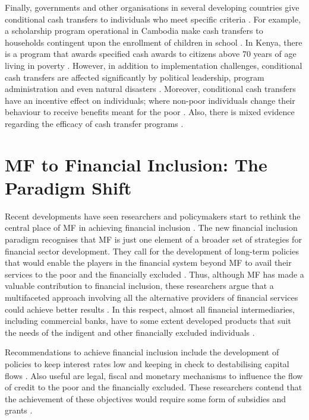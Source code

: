 \documentclass[a4paper, nobind]{templates/ociamthesis}
\begin{document}
Finally, governments and other organisations in several developing countries give conditional cash transfers to individuals who meet specific criteria \autocite{rawlings2005evaluating,tadesse2019grants}. For example, a scholarship program operational in Cambodia make cash transfers to households contingent upon the enrollment of children in school \autocite{ferreira2017own}. In Kenya, there is a program that awards specified cash awards to citizens above 70 years of age living in poverty \autocite{garcia2017educational}. However, in addition to implementation challenges, conditional cash transfers are affected significantly by political leadership, program administration and even natural disasters \autocite{rodgers2014war}. Moreover, conditional cash transfers have an incentive effect on individuals; where non-poor individuals change their behaviour to receive benefits meant for the poor \autocite{brown2012microfinance}. Also, there is mixed evidence regarding the efficacy of cash transfer programs \autocite{garcia2017educational}.

\hypertarget{mf-to-financial-inclusion-the-paradigm-shift}{%
\section{MF to Financial Inclusion: The Paradigm Shift}\label{mf-to-financial-inclusion-the-paradigm-shift}}

\noindent Recent developments have seen researchers and policymakers start to rethink the central place of MF in achieving financial inclusion \autocite{cobb2016funding}. The new financial inclusion paradigm recognises that MF is just one element of a broader set of strategies for financial sector development. They call for the development of long-term policies that would enable the players in the financial system beyond MF to avail their services to the poor and the financially excluded \autocite{ghosh2013microfinance}. Thus, although MF has made a valuable contribution to financial inclusion, these researchers argue that a multifaceted approach involving all the alternative providers of financial services could achieve better results \autocite{taylor2012antinomies}. In this respect, almost all financial intermediaries, including commercial banks, have to some extent developed products that suit the needs of the indigent and other financially excluded individuals \autocite{johnson2013microfinance,ndungumorales2017}.

Recommendations to achieve financial inclusion include the development of policies to keep interest rates low and keeping in check to destabilising capital flows \autocite{lund2017global}. Also useful are legal, fiscal and monetary mechanisms to influence the flow of credit to the poor and the financially excluded. These researchers contend that the achievement of these objectives would require some form of subsidies and grants \autocite{ghosh2013microfinance}.
\end{document}
